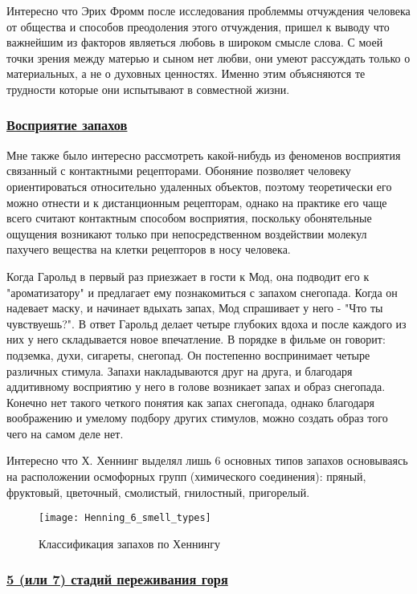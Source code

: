 \documentclass[a4paper,12pt]{report} %
\begin{document}
Интересно что Эрих Фромм после исследования проблеммы отчуждения человека от общества и способов преодоления этого отчуждения, пришел к выводу что важнейшим из факторов являеться любовь в широком смысле слова. С моей точки зрения между матерью и сыном нет любви, они умеют рассуждать только о материальных, а не о духовных ценностях. Именно этим объясняются те трудности которые они испытывают в совместной жизни.

\subsubsection{\underline{Восприятие запахов}}

Мне также было интересно рассмотреть какой-нибудь из феноменов восприятия связанный с контактными рецепторами. Обоняние позволяет человеку ориентироваться относительно удаленных объектов, поэтому теоретически его можно отнести и к дистанционным рецепторам, однако на практике его чаще всего считают контактным способом восприятия, поскольку обонятельные ощущения возникают только при непосредственном воздействии молекул пахучего вещества на клетки рецепторов в носу человека. 

Когда Гарольд в первый раз приезжает в гости к Мод, она подводит его к "ароматизатору" и предлагает ему познакомиться с запахом снегопада. Когда он надевает маску, и начинает вдыхать запах, Мод спрашивает у него - "Что ты чувствуешь?". В ответ Гарольд делает четыре глубоких вдоха и после каждого из них у него складывается новое впечатление. В порядке в фильме он говорит: подземка, духи, сигареты, снегопад. Он постепенно воспринимает четыре различных стимула. Запахи накладываются друг на друга, и благодаря аддитивному восприятию у него в голове возникает запах и образ снегопада. Конечно нет такого четкого понятия как запах снегопада, однако благодаря воображению и умелому подбору других стимулов, можно создать образ того чего на самом деле нет. 

Интересно что Х. Хеннинг выделял лишь 6 основных типов запахов основываясь на расположении осмофорных групп (химического соединения):  пряный, фруктовый, цветочный, смолистый, гнилостный, пригорелый.

\begin{figure}[!h]
	\centering
	\texttt{[image: Henning\_6\_smell\_types]}
	\caption{Классификация запахов по Хеннингу}
\end{figure}

\newpage

\subsubsection{\underline{5 (или 7) стадий переживания горя}}
\end{document}
